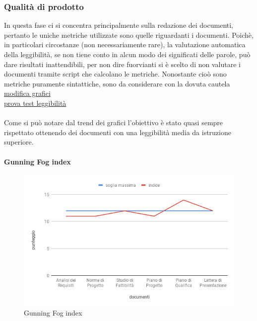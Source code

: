 \subsubsection{Qualità di prodotto}
In questa fase ci si concentra principalmente sulla redazione dei documenti, pertanto le uniche metriche utilizzate sono quelle riguardanti i documenti.
Poichè, in particolari circostanze (non necessariamente rare), la valutazione automatica della leggibilità, se non tiene conto in alcun modo dei significati delle parole, può dare risultati inattendibili, per non dire fuorvianti si è scelto di non valutare i documenti tramite script che calcolano le metriche.
Nonostante cioò sono metriche puramente sintattiche, sono da considerare con la dovuta cautela \\
\href{https://docs.google.com/spreadsheets/d/1yMKJyV4I8FXQ7GUQOq8m1RdZeTYFTJ387ixzofNrfLI/edit?usp=sharing}{modifica grafici}\\
\href{https://www.webfx.com/tools/read-able/check.php?tab=Test+By+Url&uri=https%3A%2F%2Fwww.ispazio.net}{prova test leggibilità}
	 \\ \\
	Come si può notare dal trend dei grafici l'obiettivo è stato quasi sempre rispettato ottenendo dei documenti con una leggibilità media da istruzione superiore.
	\clearpage
\paragraph{Gunning Fog index}
\hspace{15cm}
\begin{figure}[h!]
	\centering
	\includegraphics[scale=0.5]{GunningFogIndex.png}
	\caption{Gunning Fog index}

\end{figure}
